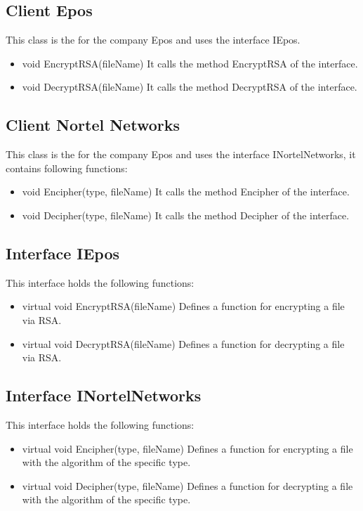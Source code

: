 \subsection{Client Epos}
This class is the for the company Epos and uses the interface IEpos.
\begin{itemize}
\item void EncryptRSA(fileName)
\subitem It calls the method EncryptRSA of the interface.
\item void DecryptRSA(fileName)
\subitem It calls the method DecryptRSA of the interface.
\end{itemize}

\subsection{Client Nortel Networks}
This class is the for the company Epos and uses the interface INortelNetworks, it contains following functions:
\begin{itemize}
\item void Encipher(type, fileName)
\subitem It calls the method Encipher of the interface.
\item void Decipher(type, fileName)
\subitem It calls the method Decipher of the interface.
\end{itemize}

\subsection{Interface IEpos}
This interface holds the following functions:
\begin{itemize}
\item virtual  void EncryptRSA(fileName)
\subitem Defines a function for encrypting a file via RSA.
\item virtual void DecryptRSA(fileName)
\subitem Defines a function for decrypting a file via RSA.
\end{itemize}

\subsection{Interface INortelNetworks}
This interface holds the following functions:
\begin{itemize}
\item virtual  void Encipher(type, fileName)
\subitem Defines a function for encrypting a file with the algorithm of the specific type.
\item virtual void Decipher(type, fileName)
\subitem Defines a function for decrypting a file with the algorithm of the specific type.
\end{itemize}

